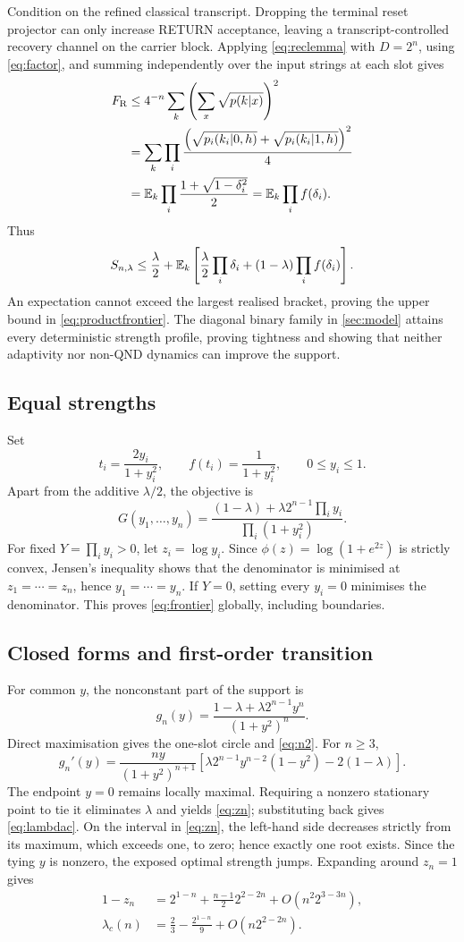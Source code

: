 Condition on the refined classical transcript. Dropping the terminal reset projector can only increase RETURN acceptance, leaving a transcript-controlled recovery channel on the carrier block. Applying \eqref{eq:reclemma} with $D=2^n$, using \eqref{eq:factor}, and summing independently over the input strings at each slot gives
\begin{align}
F_{\mathrm R}
&\leq4^{-n}\sum_k\left(\sum_x\sqrt{p(k|x)}\right)^2\\
&=\sum_k\prod_i
\frac{\left(\sqrt{p_i(k_i|0,h)}+\sqrt{p_i(k_i|1,h)}\right)^2}{4}\\
&=\mathbb E_k\prod_i\frac{1+\sqrt{1-\delta_i^2}}{2}
=\mathbb E_k\prod_i f(\delta_i).
\label{eq:FRprod}
\end{align}
Thus
\[
S_{n,\lambda}\leq\frac\lambda2+
\mathbb E_k\left[
\frac\lambda2\prod_i\delta_i+(1-\lambda)\prod_i f(\delta_i)
\right].
\]
An expectation cannot exceed the largest realised bracket, proving the upper bound in \eqref{eq:productfrontier}. The diagonal binary family in \cref{sec:model} attains every deterministic strength profile, proving tightness and showing that neither adaptivity nor non-QND dynamics can improve the support.

\subsection{Equal strengths}

Set
\[
t_i=\frac{2y_i}{1+y_i^2},\qquad
f(t_i)=\frac1{1+y_i^2},\qquad0\leq y_i\leq1.
\]
Apart from the additive $\lambda/2$, the objective is
\[
G(y_1,\ldots,y_n)=
\frac{(1-\lambda)+\lambda2^{n-1}\prod_i y_i}
{\prod_i(1+y_i^2)}.
\]
For fixed $Y=\prod_i y_i>0$, let $z_i=\log y_i$. Since
$\phi(z)=\log(1+e^{2z})$ is strictly convex, Jensen's inequality shows that the denominator is minimised at $z_1=\cdots=z_n$, hence $y_1=\cdots=y_n$. If $Y=0$, setting every $y_i=0$ minimises the denominator. This proves \eqref{eq:frontier} globally, including boundaries.

\subsection{Closed forms and first-order transition}

For common $y$, the nonconstant part of the support is
\[
g_n(y)=\frac{1-\lambda+\lambda2^{n-1}y^n}{(1+y^2)^n}.
\]
Direct maximisation gives the one-slot circle and \eqref{eq:n2}. For $n\geq3$,
\[
g_n'(y)=\frac{ny}{(1+y^2)^{n+1}}
\left[\lambda2^{n-1}y^{n-2}(1-y^2)-2(1-\lambda)\right].
\]
The endpoint $y=0$ remains locally maximal. Requiring a nonzero stationary point to tie it eliminates $\lambda$ and yields \eqref{eq:zn}; substituting back gives \eqref{eq:lambdac}. On the interval in \eqref{eq:zn}, the left-hand side decreases strictly from its maximum, which exceeds one, to zero; hence exactly one root exists. Since the tying $y$ is nonzero, the exposed optimal strength jumps. Expanding around $z_n=1$ gives
\begin{align*}
1-z_n&=2^{1-n}+\frac{n-1}{2}2^{2-2n}
       +O(n^2 2^{3-3n}),\\
\lambda_c(n)&=\frac23-\frac{2^{1-n}}9+O(n2^{2-2n}).
\end{align*}

